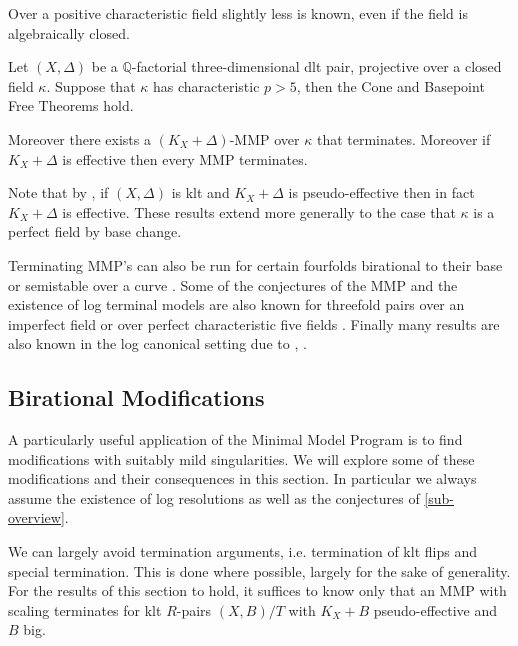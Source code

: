 Over a positive characteristic field slightly less is known, even if the field is algebraically closed. 

	\begin{theorem}\cite[Theorem 1.7]{BW17}\cite{Bir16}\cite[Theorem 1.6]{waldron2018lmmp}\cite[Proposition 6.7]{hashizume2017minimal}\label{p-MMP}
	Let $(X, \Delta)$ be a $\mathbb{Q}$-factorial three-dimensional dlt pair, projective over a closed field $\kappa$. Suppose that $\kappa$ has characteristic $p> 5$, then the Cone and Basepoint Free Theorems hold.
	
	Moreover there exists a $(K_X+\Delta)$-MMP over $\kappa$ that terminates. Moreover if $K_{X}+\Delta$ is effective then every MMP terminates.

\end{theorem}

Note that by \cite[Theorem 2]{witaszek2017canonical}, if $(X,\Delta)$ is klt and $K_{X}+\Delta$ is pseudo-effective then in fact $K_{X}+\Delta$ is effective.
These results extend more generally to the case that $\kappa$ is a perfect field by base change.

Terminating MMP's can also be run for certain fourfolds birational to their base or semistable over a curve \cite{hacon2020relative}. Some of the conjectures of the MMP and the existence of log terminal models are also known for threefold pairs over an imperfect field \cite{das2019log} or over perfect characteristic five fields \cite{hacon2019minimal}. Finally many results are also known in the log canonical setting due to \cite{waldron2018lmmp}, \cite{hashizume2017minimal}.


\subsection{Birational Modifications}\label{subsec-mod}

A particularly useful application of the Minimal Model Program is to find modifications with suitably mild singularities. We will explore some of these modifications and their consequences in this section. In particular we always assume the existence of log resolutions as well as the conjectures of \autoref{sub-overview}. 

We can largely avoid termination arguments, i.e. termination of klt flips and special termination. This is done where possible, largely for the sake of generality. For the results of this section to hold, it suffices to know only that an MMP with scaling terminates for klt $R$-pairs $(X,B)/T$ with $K_{X}+B$ pseudo-effective and $B$ big. 

